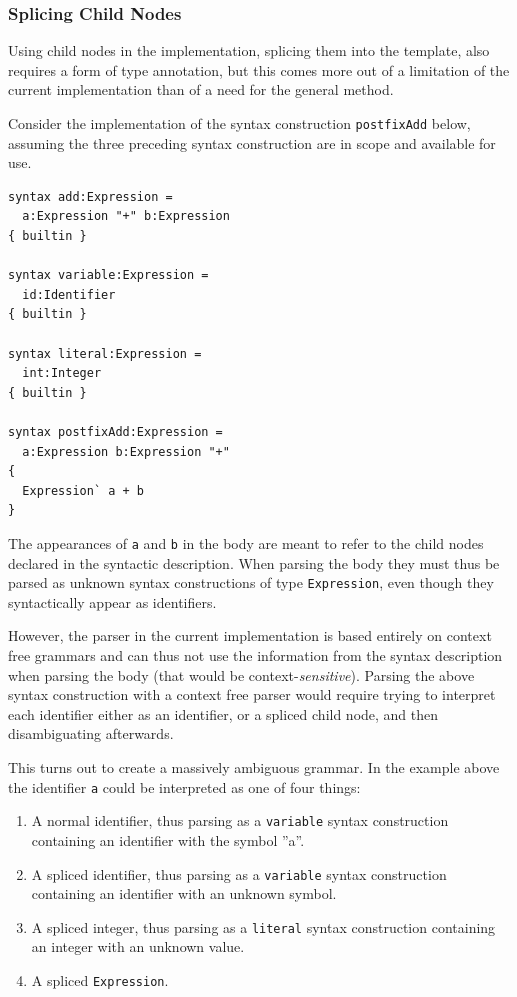 \documentclass{kththesis}
\begin{document}
\subsubsection{Splicing Child Nodes}

Using child nodes in the implementation, splicing them into the template, also requires a form of type annotation, but this comes more out of a limitation of the current implementation than of a need for the general method.

Consider the implementation of the syntax construction \texttt{postfixAdd} below, assuming the three preceding syntax construction are in scope and available for use.

\begin{verbatim}
syntax add:Expression =
  a:Expression "+" b:Expression
{ builtin }

syntax variable:Expression =
  id:Identifier
{ builtin }

syntax literal:Expression =
  int:Integer
{ builtin }

syntax postfixAdd:Expression =
  a:Expression b:Expression "+"
{
  Expression` a + b
}
\end{verbatim}

The appearances of \texttt{a} and \texttt{b} in the body are meant to refer to the child nodes declared in the syntactic description. When parsing the body they must thus be parsed as unknown syntax constructions of type \texttt{Expression}, even though they syntactically appear as identifiers.

However, the parser in the current implementation is based entirely on context free grammars and can thus not use the information from the syntax description when parsing the body (that would be context-\emph{sensitive}). Parsing the above syntax construction with a context free parser would require trying to interpret each identifier either as an identifier, or a spliced child node, and then disambiguating afterwards.

This turns out to create a massively ambiguous grammar. In the example above the identifier \texttt{a} could be interpreted as one of four things:
\begin{enumerate}
  \item A normal identifier, thus parsing as a \texttt{variable} syntax construction containing an identifier with the symbol ''a''.
  \item A spliced identifier, thus parsing as a \texttt{variable} syntax construction containing an identifier with an unknown symbol.
  \item A spliced integer, thus parsing as a \texttt{literal} syntax construction containing an integer with an unknown value.
  \item A spliced \texttt{Expression}.
\end{enumerate}
\end{document}
